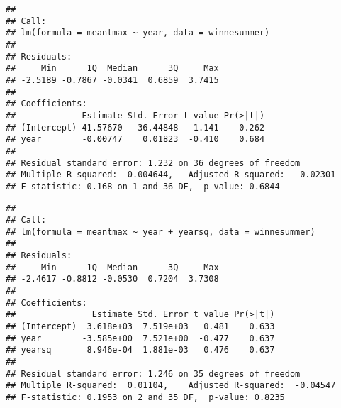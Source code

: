 \documentclass[
]{book}
\newenvironment{Shaded}{\begin{snugshade}}{\end{snugshade}}
\newcommand{\CommentTok}[1]{\textcolor[rgb]{0.56,0.35,0.01}{\textit{#1}}}
\newcommand{\DecValTok}[1]{\textcolor[rgb]{0.00,0.00,0.81}{#1}}
\newcommand{\FunctionTok}[1]{\textcolor[rgb]{0.00,0.00,0.00}{#1}}
\newcommand{\NormalTok}[1]{#1}
\newcommand{\OtherTok}[1]{\textcolor[rgb]{0.56,0.35,0.01}{#1}}
\newcommand{\SpecialCharTok}[1]{\textcolor[rgb]{0.00,0.00,0.00}{#1}}
\begin{document}
\begin{verbatim}
## 
## Call:
## lm(formula = meantmax ~ year, data = winnesummer)
## 
## Residuals:
##     Min      1Q  Median      3Q     Max 
## -2.5189 -0.7867 -0.0341  0.6859  3.7415 
## 
## Coefficients:
##             Estimate Std. Error t value Pr(>|t|)
## (Intercept) 41.57670   36.44848   1.141    0.262
## year        -0.00747    0.01823  -0.410    0.684
## 
## Residual standard error: 1.232 on 36 degrees of freedom
## Multiple R-squared:  0.004644,   Adjusted R-squared:  -0.02301 
## F-statistic: 0.168 on 1 and 36 DF,  p-value: 0.6844
\end{verbatim}

\begin{Shaded}
\end{Shaded}

\begin{verbatim}
## 
## Call:
## lm(formula = meantmax ~ year + yearsq, data = winnesummer)
## 
## Residuals:
##     Min      1Q  Median      3Q     Max 
## -2.4617 -0.8812 -0.0530  0.7204  3.7308 
## 
## Coefficients:
##               Estimate Std. Error t value Pr(>|t|)
## (Intercept)  3.618e+03  7.519e+03   0.481    0.633
## year        -3.585e+00  7.521e+00  -0.477    0.637
## yearsq       8.946e-04  1.881e-03   0.476    0.637
## 
## Residual standard error: 1.246 on 35 degrees of freedom
## Multiple R-squared:  0.01104,    Adjusted R-squared:  -0.04547 
## F-statistic: 0.1953 on 2 and 35 DF,  p-value: 0.8235
\end{verbatim}

\begin{Shaded}
\end{Shaded}
\end{document}
